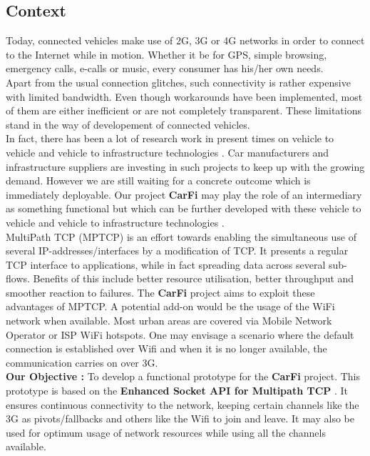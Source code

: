 \documentclass[a4paper,11pt]{article}
\begin{document}
		\subsection{Context}
			\begin{description}
				\item \hspace{2cm} Today, connected vehicles make use of 2G, 3G or 4G networks in order to connect to the Internet while in motion. Whether it be for GPS, simple browsing, emergency calls, e-calls or music, every consumer has his/her own needs. \\

				Apart from the usual connection glitches, such connectivity is rather expensive with limited bandwidth. Even though workarounds have been implemented, most of them are either inefficient or are not completely transparent. These limitations stand in the way of developement of connected vehicles. \\

				In fact, there has been a lot of research work in present times on vehicle to vehicle and vehicle to infrastructure technologies \cite[V2x]{V2I}. Car manufacturers and infrastructure suppliers are investing in such projects to keep up with the growing demand. However we are still waiting for a concrete outcome which is immediately deployable. Our project \textbf{CarFi} may play the role of an intermediary as something functional but which can be further developed with these vehicle to vehicle and vehicle to infrastructure technologies \cite[V2x]{V2x, smartcities}. \\

				MultiPath TCP (MPTCP) is an effort towards enabling the simultaneous use of several IP-addresses/interfaces by a modification of TCP. It presents a regular TCP interface to applications, while in fact spreading data across several sub-flows. Benefits of this include better resource utilisation, better throughput and smoother reaction to failures. The \textbf{CarFi} project aims to exploit these advantages of MPTCP. A potential add-on would be the usage of the WiFi network when available. Most urban areas are covered via Mobile Network Operator or ISP WiFi hotspots. One may envisage a scenario where the default connection is established over Wifi and when it is no longer available, the communication carries on over 3G. \\

				\textbf{Our Objective :} To develop a functional prototype for the \textbf{CarFi} project. This prototype is based on the \textbf{Enhanced Socket API for Multipath TCP} \cite[API]{api}. It ensures continuous connectivity to the network, keeping certain channels like the 3G as pivots/fallbacks and others like the Wifi to join and leave. It may also be used for optimum usage of network resources while using all the channels available.
				
			\end{description}
	
\end{document}

